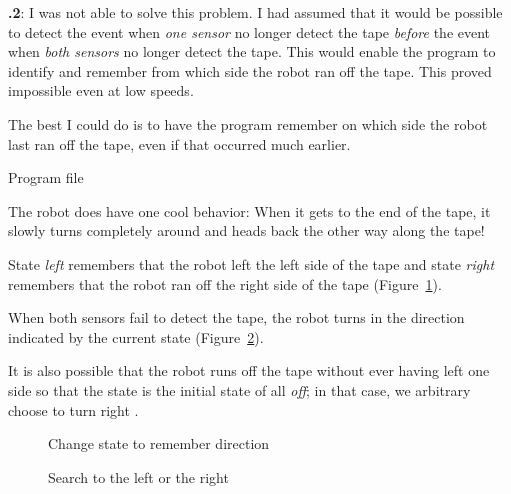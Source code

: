 \documentclass[12pt,a4paper,english]{article}
\begin{document}
\textbf{\thesection.2}:
I was not able to solve this problem. I had assumed that it would be
possible to detect the event when \emph{one sensor} no longer detect the
tape \emph{before} the event when \emph{both sensors} no longer detect
the tape. This would enable the program to identify and remember from
which side the robot ran off the tape. This proved impossible even at
low speeds.

The best I could do is to have the program remember on which side the
robot last ran off the tape, even if that occurred much earlier.

{\raggedleft \hfill Program file }

The robot does have one cool behavior: When it gets to the end of the
tape, it slowly turns completely around and heads back the other way
along the tape!

State \emph{left}  remembers that the robot left the
left side of the tape and state \emph{right} 
remembers that the robot ran off the right side of the tape
(Figure~\ref{fig.follow3}).

When both sensors fail to detect the tape, the robot turns in the
direction indicated by the current state (Figure~\ref{fig.follow1}).

It is also possible that the robot runs off the tape without ever having
left one side so that the state is the initial state of all \emph{off};
in that case, we arbitrary choose to turn right .

\begin{figure}
\begin{center}
\caption{Change state to remember direction}\label{fig.follow3}
\end{center}
\end{figure}

\begin{figure}
\begin{center}
\caption{Search to the left or the right}\label{fig.follow1}
\end{center}
\end{figure}
\end{document}
